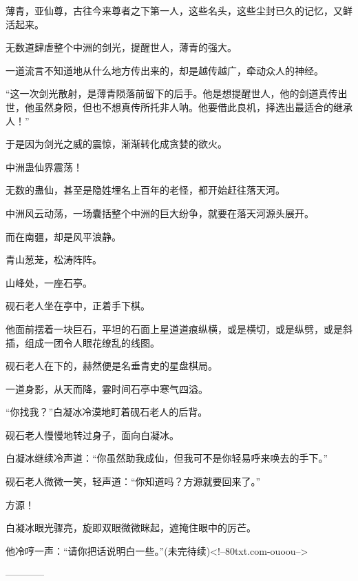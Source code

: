 \begin{this_body}
薄青，亚仙尊，古往今来尊者之下第一人，这些名头，这些尘封已久的记忆，又鲜活起来。

无数道肆虐整个中洲的剑光，提醒世人，薄青的强大。

一道流言不知道地从什么地方传出来的，却是越传越广，牵动众人的神经。

“这一次剑光散射，是薄青陨落前留下的后手。他是想提醒世人，他的剑道真传出世，他虽然身陨，但也不想真传所托非人呐。他要借此良机，择选出最适合的继承人！”

于是因为剑光之威的震惊，渐渐转化成贪婪的欲火。

中洲蛊仙界震荡！

无数的蛊仙，甚至是隐姓埋名上百年的老怪，都开始赶往落天河。

中洲风云动荡，一场囊括整个中洲的巨大纷争，就要在落天河源头展开。

而在南疆，却是风平浪静。

青山葱茏，松涛阵阵。

山峰处，一座石亭。

砚石老人坐在亭中，正着手下棋。

他面前摆着一块巨石，平坦的石面上星道道痕纵横，或是横切，或是纵劈，或是斜插，组成一团令人眼花缭乱的线图。

砚石老人在下的，赫然便是名垂青史的星盘棋局。

一道身影，从天而降，霎时间石亭中寒气四溢。

“你找我？”白凝冰冷漠地盯着砚石老人的后背。

砚石老人慢慢地转过身子，面向白凝冰。

白凝冰继续冷声道：“你虽然助我成仙，但我可不是你轻易呼来唤去的手下。”

砚石老人微微一笑，轻声道：“你知道吗？方源就要回来了。”

方源！

白凝冰眼光骤亮，旋即双眼微微眯起，遮掩住眼中的厉芒。

他冷哼一声：“请你把话说明白一些。”(未完待续)<!--80txt.com-ouoou-->

------------

\end{this_body}

